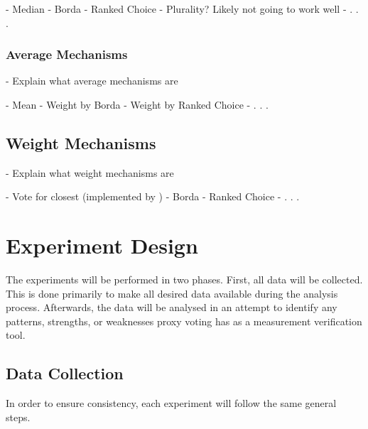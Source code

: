 - Median
- Borda
- Ranked Choice
- Plurality? Likely not going to work well
- . . .

\subsubsection{Average Mechanisms}\label{subsubsec:average-mechanisms}
- Explain what average mechanisms are

- Mean
- Weight by Borda
- Weight by Ranked Choice
- . . .

\subsection{Weight Mechanisms}\label{subsec:weight-mechanisms}
- Explain what weight mechanisms are

- Vote for closest (implemented by \cite{Cohensius2017})
- Borda
- Ranked Choice
- . . .


\section{Experiment Design}\label{sec:experiment-design}
%
%

The experiments will be performed in two phases.
First, all data will be collected.
This is done primarily to make all desired data available during the analysis
process.
Afterwards, the data will be analysed in an attempt to identify any patterns,
strengths, or weaknesses proxy voting has as a measurement verification tool.

\subsection{Data Collection}\label{subsec:data-collection}
In order to ensure consistency, each experiment will follow the same general
steps.

